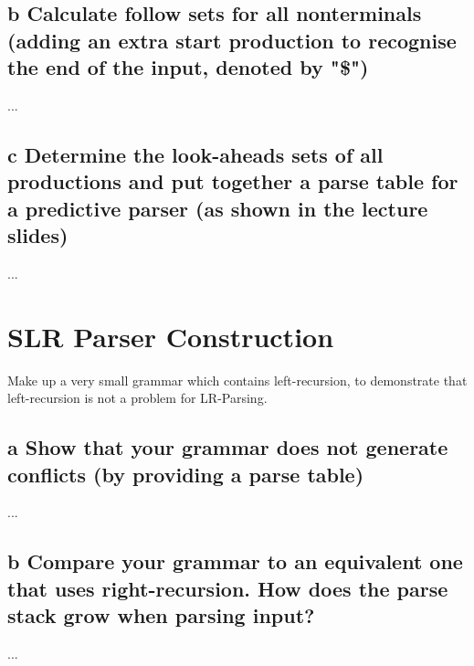 \documentclass[11pt,a4paper]{article}
\begin{document}
\subsection*{b \mdseries Calculate follow sets for all nonterminals (adding an
extra start production to recognise the end of the input, denoted by "\$")}
...

\subsection*{c \mdseries Determine the look-aheads sets of all productions and
put together a parse table for a predictive parser (as shown in the lecture
slides)}
...

\newpage
\section{SLR Parser Construction}
Make up a very small grammar which contains left-recursion, to demonstrate
that left-recursion is not a problem for LR-Parsing.

\subsection*{a \mdseries Show that your grammar does not generate conflicts
(by providing a parse table)}
...

\subsection*{b \mdseries Compare your grammar to an equivalent one that uses
right-recursion. How does the parse stack grow when parsing input?}
...
\end{document}
